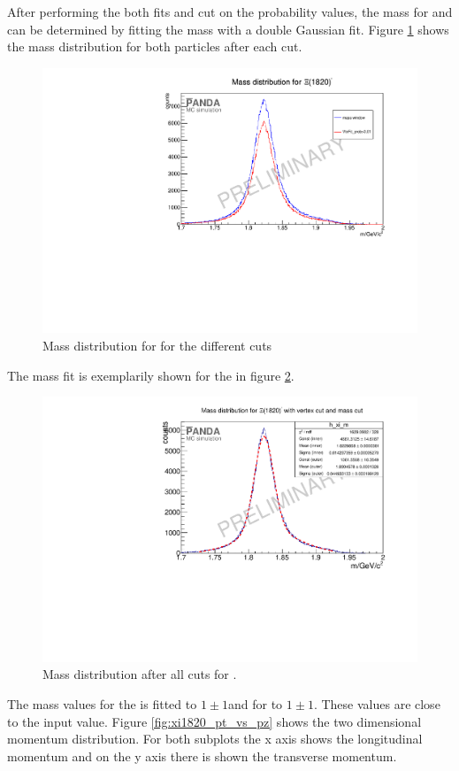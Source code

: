 	After performing the both fits and cut on the probability values, the mass for \excitedcascade and \excitedanticascade
	can be determined by fitting the mass with a double Gaussian fit. 
	Figure \ref{fig:xi1820_mass_diffcuts} shows the mass distribution for both particles after each cut.
	
	\begin{figure}
		\centering
		\includegraphics[width=1.\textwidth]{./plots/Xi1820/XiMinus1820_m_diffcuts.pdf}
		\caption{\propose Mass distribution for \excitedcascade for the different cuts}
		\label{fig:xi1820_mass_diffcuts}
	
	\end{figure}
	The mass fit is exemplarily shown for the \excitedcascade in figure \ref{fig:xi1820_massfit}. 
	
	\begin{figure}
		\centering
		\includegraphics[width=1.\textwidth]{./plots/Xi1820/XiMinus1820_m_masscut.pdf}
		\caption{\propose Mass distribution after all cuts for \excitedcascade.}
		\label{fig:xi1820_massfit}
	\end{figure}
	The mass values for the \excitedcascade is fitted to $1 \pm 1$\massunit and for \excitedanticascade to $1 \pm 1 $\massunit.
	These values are close to the input value.
	Figure \ref{fig:xi1820_pt_vs_pz} shows the two dimensional momentum distribution. For both subplots the x axis shows the longitudinal momentum
	and on the y axis there is shown the transverse momentum.
	
